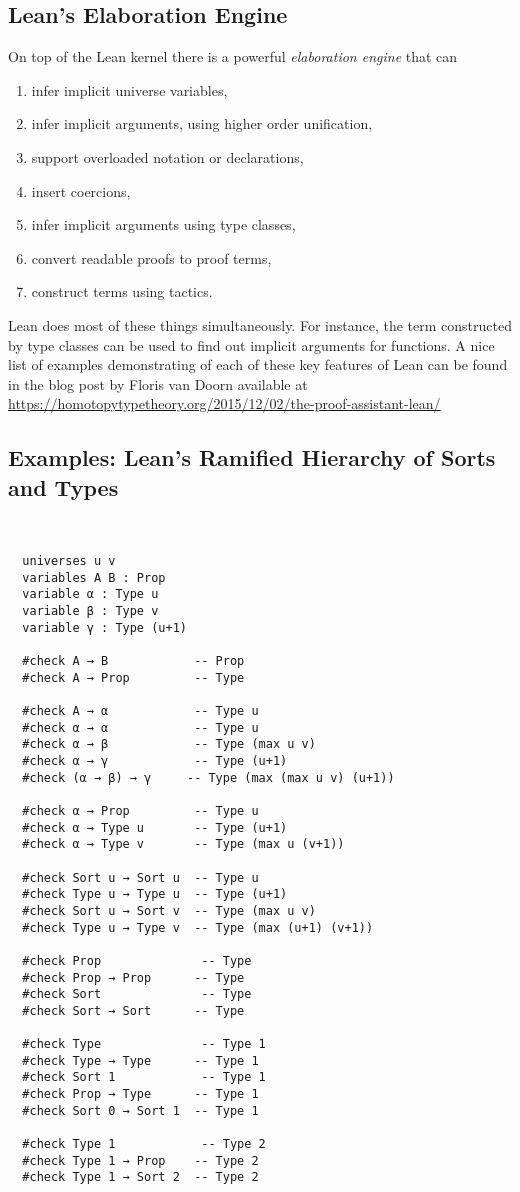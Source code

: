 \documentclass[11pt]{amsart}  %
\begin{document}
\subsection{Lean's Elaboration Engine}

On top of the Lean kernel there is a powerful \emph{elaboration engine} that can
\begin{enumerate}
\item infer implicit universe variables,
\item infer implicit arguments, using higher order unification,
\item support overloaded notation or declarations,
\item insert coercions,
\item infer implicit arguments using type classes,
\item convert readable proofs to proof terms,
\item construct terms using tactics.
\end{enumerate}
Lean does most of these things simultaneously. For instance, the term constructed by
type classes can be used to find out implicit arguments for functions.
A nice list of examples demonstrating of each of these key features of Lean can be found in the blog post by Floris van Doorn available at
\url{https://homotopytypetheory.org/2015/12/02/the-proof-assistant-lean/}








\subsection{Examples: Lean's Ramified Hierarchy of Sorts and Types}
\label{sec:sorts-and-types}
~
\begin{lstlisting}
  universes u v
  variables A B : Prop
  variable α : Type u
  variable β : Type v
  variable γ : Type (u+1)

  #check A → B            -- Prop
  #check A → Prop         -- Type

  #check A → α            -- Type u
  #check α → α            -- Type u
  #check α → β            -- Type (max u v)
  #check α → γ            -- Type (u+1) 
  #check (α → β) → γ     -- Type (max (max u v) (u+1))

  #check α → Prop         -- Type u
  #check α → Type u       -- Type (u+1)
  #check α → Type v       -- Type (max u (v+1))

  #check Sort u → Sort u  -- Type u
  #check Type u → Type u  -- Type (u+1)
  #check Sort u → Sort v  -- Type (max u v)
  #check Type u → Type v  -- Type (max (u+1) (v+1))

  #check Prop              -- Type 
  #check Prop → Prop      -- Type 
  #check Sort              -- Type 
  #check Sort → Sort      -- Type 

  #check Type              -- Type 1
  #check Type → Type      -- Type 1
  #check Sort 1            -- Type 1
  #check Prop → Type      -- Type 1
  #check Sort 0 → Sort 1  -- Type 1

  #check Type 1            -- Type 2
  #check Type 1 → Prop    -- Type 2
  #check Type 1 → Sort 2  -- Type 2
\end{lstlisting}
\end{document}
